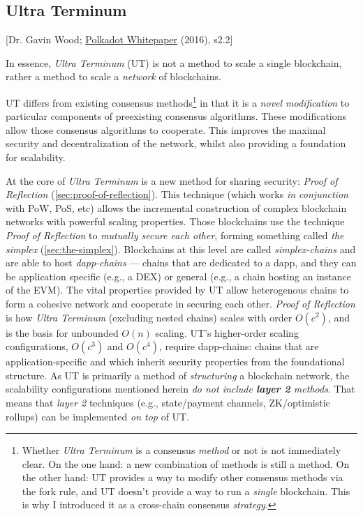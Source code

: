 \subsection{Ultra Terminum}

[Dr. Gavin Wood; \href{\citePolkadotLink}{Polkadot Whitepaper} (2016), s2.2]

In essence, \emph{Ultra Terminum} (UT) is not a method to scale a single blockchain, rather a method to scale a \emph{network} of blockchains.

UT differs from existing consensus methods\footnote{
  Whether \emph{Ultra Terminum} is a consensus \emph{method} or not is not immediately clear.
    On the one hand: a new combination of methods is still a method.
    On the other hand: UT provides a way to modify other consensus methods via the fork rule, and UT doesn't provide a way to run a \emph{single} blockchain.
    This is why I introduced it as a cross-chain consensus \emph{strategy}.
} in that it is a \emph{novel modification} to particular components of preexisting consensus algorithms.
These modifications allow those consensus algorithms to cooperate.
This improves the maximal security and decentralization of the network, whilst also providing a foundation for scalability.

At the core of \emph{Ultra Terminum} is a new method for sharing security: \emph{Proof of Reflection} (\autoref{sec:proof-of-reflection}).
This technique (which works \emph{in conjunction} with PoW, PoS, etc) allows the incremental construction of complex blockchain networks with powerful scaling properties.
Those blockchains use the technique \emph{Proof of Reflection} to \emph{mutually secure each other}, forming something called \emph{the simplex} (\autoref{sec:the-simplex}).
Blockchains at this level are called \emph{simplex-chains} and are able to host \emph{dapp-chains} --- chains that are dedicated to a dapp, and they can be application specific (e.g., a DEX) or general (e.g., a chain hosting an instance of the EVM).
The vital properties provided by UT allow heterogenous chains to form a cohesive network and cooperate in securing each other.
\emph{Proof of Reflection} is how \emph{Ultra Terminum} (excluding nested chains) scales with order $O(c^2)$, and is the basis for unbounded $O(n)$ scaling.
UT's higher-order scaling configurations, $O(c^3)$ and $O(c^4)$, require dapp-chains: chains that are application-specific and which inherit security properties from the foundational structure.
As UT is primarily a method of \emph{structuring} a blockchain network, the scalability configurations mentioned herein \emph{do not include \textbf{layer 2} methods}.
That means that \emph{layer 2} techniques (e.g., state/payment channels, ZK/optimistic rollups) can be implemented \emph{on top} of UT.

